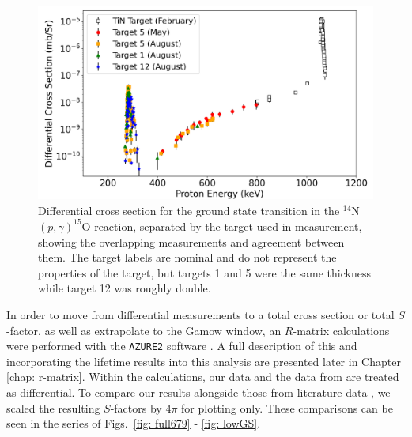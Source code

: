 \begin{figure}
		\includegraphics[width=1.0\linewidth]{figures/cs_gs_targs.png}
	\caption{Differential cross section for the ground state transition in the $^{14}$N$\left( p,\gamma \right) ^{15}$O reaction, separated by the target used in measurement, showing the overlapping measurements and agreement between them. The target labels are nominal and do not represent the properties of the target, but targets 1 and 5 were the same thickness while target 12 was roughly double.}
	\label{fig: csGS_targs}
\end{figure}




In order to move from differential measurements to a total cross section or total $S$-factor, as well as extrapolate to the Gamow window, an $R$-matrix calculations were performed with the \texttt{AZURE2} software \cite{Azuma2010}. A full description of this and incorporating the lifetime results into this analysis are presented later in Chapter \ref{chap: r-matrix}. Within the calculations, our data and the data from \citet{Li2016} are treated as differential. To compare our results alongside those from literature data \cite{Schroder1987, Imbriani2005, Runkle2005, Li2016, Wagner2018}, we scaled the resulting $S$-factors by $4\pi$ for plotting only.  These comparisons can be seen in the series of Figs.\ \ref{fig: full679} - \ref{fig: lowGS}. 


